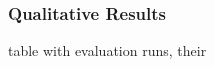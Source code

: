 \documentclass[11pt]{scrreprt}
\begin{document}
\subsubsection{Qualitative Results}


table with evaluation runs, their 






%
%
%
%
%
%
%
%
%
\end{document}
